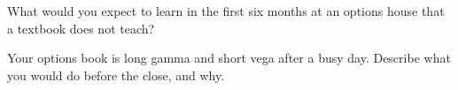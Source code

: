 \begin{interviewq}\label{iq:in:the-options-market-making-houses:5}
What would you expect to learn in the first six months at an options house that a textbook does not teach?
\end{interviewq}

\begin{interviewq}\label{iq:in:the-options-market-making-houses:6}
Your options book is long gamma and short vega after a busy day. Describe what you would do before the close, and why.
\end{interviewq}
